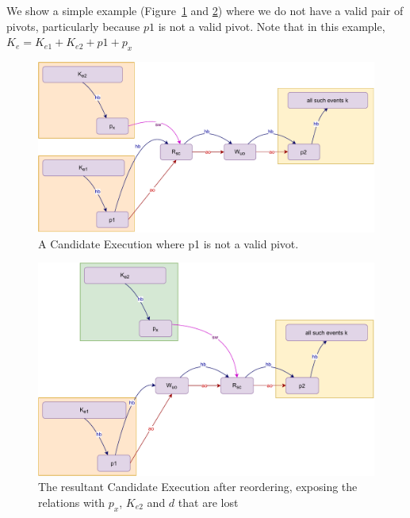    We show a simple example (Figure~\ref{reord:preserve_hb(c)} and \ref{reord:preserve_hb(d)}) where we do not have a valid pair of pivots, particularly because $p1$ is not a valid pivot. 
    Note that in this example, $K_e = K_{e1} + K_{e2} + p1 + p_x$
    \begin{figure}[H]
        \centering
        \includegraphics[scale=0.6]{4.InstructionReordering/4.ValidReorderingCandidate/ProofParts/Part1/part1(e).pdf}
        \caption{A Candidate Execution where p1 is not a valid pivot.}
        \label{reord:preserve_hb(c)}
    \end{figure}
    
    \begin{figure}[H]
        \centering
        \includegraphics[scale=0.6]{4.InstructionReordering/4.ValidReorderingCandidate/ProofParts/Part1/part1(f).pdf}
        \caption{The resultant Candidate Execution after reordering, exposing the relations with $p_x$, $K_{e2}$ and $d$ that are lost}
        \label{reord:preserve_hb(d)}
    \end{figure}
        
